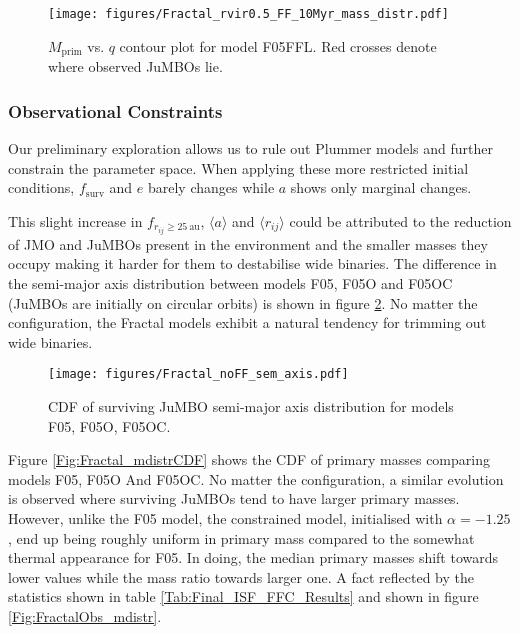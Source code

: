 \documentclass[aa]{aa}
\begin{document}
   \begin{figure}
    \centering
        \texttt{[image: figures/Fractal\_rvir0.5\_FF\_10Myr\_mass\_distr.pdf]}
        \caption{$M_{\mathrm{prim}}$ vs. $q$ contour plot for model F05FFL. Red crosses denote where observed JuMBOs lie.}
         \label{Fig:SimTime_MPrimQ}
   \end{figure}
   
    \subsubsection{Observational Constraints}
    Our preliminary exploration allows us to rule out Plummer models and further constrain the parameter space. When applying these more restricted initial conditions, $f_{\mathrm{surv}}$ and $e$ barely changes while $a$ shows only marginal changes.

    This slight increase in $f_{r_{ij}\geq25\ \mathrm{au}}$, $\langle a\rangle$ and $\langle r_{ij}\rangle$ could be attributed to the reduction of JMO and JuMBOs present in the environment and the smaller masses they occupy making it harder for them to destabilise wide binaries. The difference in the semi-major axis distribution between models F05, F05O and F05OC (JuMBOs are initially on circular orbits) is shown in figure \ref{Fig:Semi_Fractal}. No matter the configuration, the Fractal models exhibit a natural tendency for trimming out wide binaries.
    
   \begin{figure}
    \centering
        \texttt{[image: figures/Fractal\_noFF\_sem\_axis.pdf]}
        \caption{CDF of surviving JuMBO semi-major axis distribution for models F05, F05O, F05OC.}
         \label{Fig:Semi_Fractal}
   \end{figure}

   Figure \ref{Fig:Fractal_mdistrCDF} shows the CDF of primary masses comparing models F05, F05O And F05OC. No matter the configuration, a similar evolution is observed where surviving JuMBOs tend to have larger primary masses. However, unlike the F05 model, the constrained model, initialised with $\alpha = -1.25$, end up being roughly uniform in primary mass compared to the somewhat thermal appearance for F05. In doing, the median primary masses shift towards lower values while the mass ratio towards larger one. A fact reflected by the statistics shown in table \ref{Tab:Final_ISF_FFC_Results} and shown in figure \ref{Fig:FractalObs_mdistr}.
    
\end{document}
